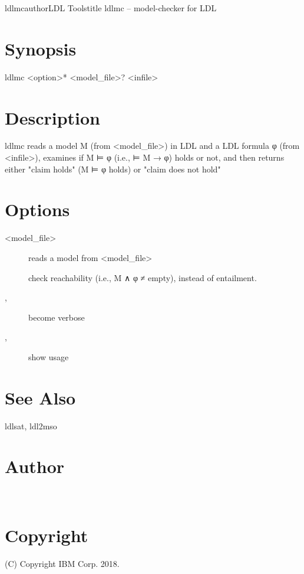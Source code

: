 \documentclass[fancy]{article}
\begin{document}
\begin{Name}{1}{ldlmc}{author}{LDL Tools}{title}
ldlmc -- model-checker for LDL
\end{Name}

\section{Synopsis}
ldlmc <option>* <model_file>? <infile>

\section{Description}
ldlmc reads a model M (from <model_file>) in LDL and a LDL formula φ (from <infile>),
examines if M ⊨ φ (i.e., ⊨ M → φ) holds or not, and then
returns either "claim holds" (M ⊨ φ holds) or "claim does not hold" 

\section{Options}
\begin{description}
%
\item[ <model_file>]
reads a model from <model_file>
%
\item[]
check reachability (i.e., M ∧ φ ≠ empty), instead of entailment.
%
\item[, ]
become verbose
%
\item[, ]
show usage
\end{description}

\section{See Also}
ldlsat, ldl2mso

\section{Author}
\\

\section{Copyright}
(C) Copyright IBM Corp. 2018.
\end{document}
